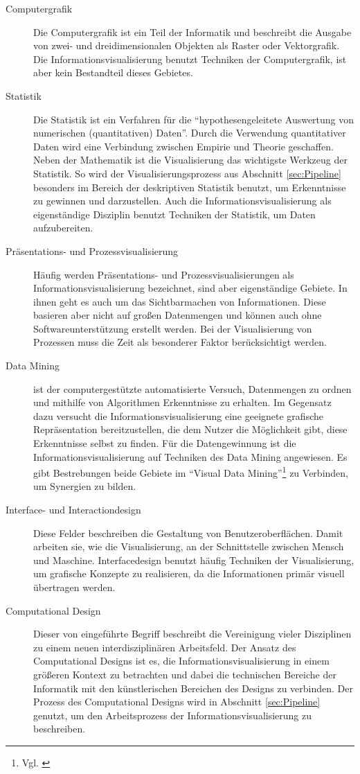 \documentclass[a4paper, 
               12pt,
               DIV=calc,
               version=first,
               pdftex,
               headsepline,
               footsepline,
               bibtotocnumbered,
               liststotocnumbered]{scrreprt}
\begin{document}
\begin{description}
\item[Computergrafik]
Die Computergrafik ist ein Teil der Informatik und beschreibt die Ausgabe von zwei- und dreidimensionalen
Objekten als Raster oder Vektorgrafik. Die Informationsvisualisierung benutzt Techniken der Computergrafik, ist aber kein
Bestandteil dieses Gebietes.
\item[Statistik]
Die Statistik ist ein Verfahren für die "`hypothesengeleitete Auswertung von numerischen (quantitativen)
Daten"'\citep[S.\,23]{Statistik}. Durch die Verwendung quantitativer Daten wird eine Verbindung zwischen
Empirie und Theorie geschaffen.  Neben der Mathematik ist die Visualisierung das wichtigste
Werkzeug der Statistik. So wird der Visualisierungsprozess aus Abschnitt \ref{sec:Pipeline} besonders
im Bereich der deskriptiven Statistik benutzt, um Erkenntnisse zu gewinnen und darzustellen.
Auch die Informationsvisualisierung als eigenständige Disziplin benutzt Techniken der Statistik, um Daten aufzubereiten.
\item[Präsentations- und Prozessvisualisierung]
Häufig werden Präsentations- und Prozessvisualisierungen als Informationsvisualisierung bezeichnet, sind
aber eigenständige Gebiete. In ihnen geht es auch um das Sichtbarmachen von Informationen. Diese basieren aber nicht auf
großen Datenmengen und können auch ohne Softwareunterstützung erstellt werden. Bei der Visualisierung
von Prozessen muss die Zeit als besonderer Faktor berücksichtigt werden.
\item[Data Mining] ist der computergestützte automatisierte Versuch, Datenmengen zu ordnen und mithilfe
von Algorithmen Erkenntnisse zu erhalten. Im Gegensatz dazu versucht die Informationsvisualisierung eine geeignete
grafische Repräsentation
bereitzustellen, die dem Nutzer die Möglichkeit gibt, diese Erkenntnisse selbst zu finden. Für die Datengewinnung
ist die Informationsvisualisierung auf Techniken des Data Mining angewiesen. Es gibt Bestrebungen beide Gebiete 
im "`Visual Data Mining"'\footnote{Vgl. \citep{Keim}} zu Verbinden, um Synergien zu bilden.
\item[Interface- und Interactiondesign]
Diese Felder beschreiben die Gestaltung von Benutzeroberflächen. Damit arbeiten sie, wie die Visualisierung, an
der Schnittstelle zwischen Mensch und Maschine. Interfacedesign benutzt häufig Techniken der Visualisierung,
um grafische Konzepte zu realisieren, da die Informationen primär visuell übertragen werden.
\item[Computational Design]
Dieser von \cite{BenFry} eingeführte Begriff beschreibt die Vereinigung vieler Disziplinen zu einem neuen
interdisziplinären Arbeitsfeld. Der Ansatz des Computational Designs ist es, die Informationsvisualisierung in einem größeren
Kontext zu betrachten und dabei die technischen Bereiche der Informatik mit den künstlerischen
Bereichen des Designs zu verbinden. Der Prozess des Computational Designs wird in Abschnitt \ref{sec:Pipeline}
genutzt, um den Arbeitsprozess der Informationsvisualisierung zu beschreiben.
\end{description}
\end{document}
